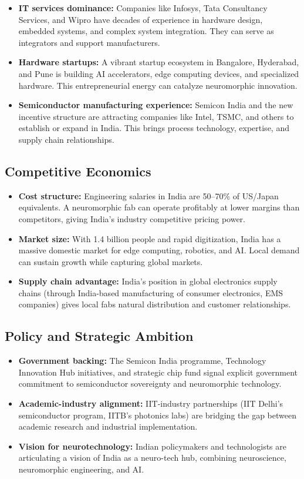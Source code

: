 \begin{itemize}
\item \textbf{IT services dominance:} Companies like Infosys, Tata Consultancy Services, and Wipro have decades of experience in hardware design, embedded systems, and complex system integration. They can serve as integrators and support manufacturers.
\item \textbf{Hardware startups:} A vibrant startup ecosystem in Bangalore, Hyderabad, and Pune is building AI accelerators, edge computing devices, and specialized hardware. This entrepreneurial energy can catalyze neuromorphic innovation.
\item \textbf{Semiconductor manufacturing experience:} Semicon India and the new incentive structure are attracting companies like Intel, TSMC, and others to establish or expand in India. This brings process technology, expertise, and supply chain relationships.
\end{itemize}

\subsection{Competitive Economics}

\begin{itemize}
\item \textbf{Cost structure:} Engineering salaries in India are 50--70\% of US/Japan equivalents. A neuromorphic fab can operate profitably at lower margins than competitors, giving India's industry competitive pricing power.
\item \textbf{Market size:} With 1.4 billion people and rapid digitization, India has a massive domestic market for edge computing, robotics, and AI. Local demand can sustain growth while capturing global markets.
\item \textbf{Supply chain advantage:} India's position in global electronics supply chains (through India-based manufacturing of consumer electronics, EMS companies) gives local fabs natural distribution and customer relationships.
\end{itemize}

\subsection{Policy and Strategic Ambition}

\begin{itemize}
\item \textbf{Government backing:} The Semicon India programme, Technology Innovation Hub initiatives, and strategic chip fund signal explicit government commitment to semiconductor sovereignty and neuromorphic technology.
\item \textbf{Academic-industry alignment:} IIT-industry partnerships (IIT Delhi's semiconductor program, IITB's photonics labs) are bridging the gap between academic research and industrial implementation.
\item \textbf{Vision for neurotechnology:} Indian policymakers and technologists are articulating a vision of India as a neuro-tech hub, combining neuroscience, neuromorphic engineering, and AI.
\end{itemize}

